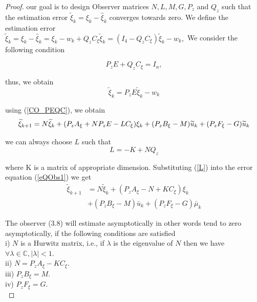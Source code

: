 \documentclass[conference]{IEEEtran}
\begin{document}
\begin{proof}
    

 our goal is to design Observer matrices $N, L, M, G, P_{z}$ and $Q_z$ such that the estimation error ${\widetilde\xi}_{k}={\xi}_{k}-{\hat{\xi}}_{k}$ converges towards zero. We define the estimation error\\
${\widetilde\xi}_{k}={\xi}_{k}-{\hat{\xi}}_{k}={\xi}_{k}-w_{k}+Q_{z}C_{\xi}{\widetilde\xi}_{k}=\left(I_{4}-Q_{z}C_{\xi}\right){\widetilde\xi}_{k}-w_{k},$
We consider the following condition

\begin{equation}\label{CO_PEQC}
    P_{z}E+Q_{z}C_{\xi}=I_{n},
\end{equation}

thus, we obtain \\
\begin{equation}
    \widetilde\xi_{k}=P_{z}E\widetilde\xi_{k}-w_{k}
\end{equation}

using (\ref{CO_PEQC}), we obtain 
\begin{equation}\label{eQObs1}
 \widetilde{\xi}_{k+1}=N\widetilde\xi_{k}+(P_{z}A_{\xi}+N P_{z}E \\
 -L C_{\xi})\xi_{k}+(P_{z}B_{\xi}-M)\widetilde{u}_{k}+(P_{z}F_{\xi}-G)\widetilde{u}_{k}
\end{equation}

we can always choose $L$ such that
\begin{equation}\label{L}
    L = -K + NQ_z
\end{equation}

where K is a matrix of appropriate dimension. Substituting (\ref{L}) into the error equation (\ref{eQObs1}) we get
\begin{align*}
    \tilde{\xi}_{k+1}&=N \tilde{\xi}_k+\left(P_z A_{\xi}-N+K C_{\xi}\right) \xi_k\\
    &+\left(P_z B_{\xi}-M\right) \bar{u}_k+\left(P_z F_{\xi}-G\right) \bar{\mu}_k
\end{align*}


The observer (3.8) will estimate asymptotically  in other words tend to zero asymptotically, if the following conditions are satisfied\\

i) $N$ is a Hurwitz matrix, i.e., if $\lambda$ is the eigenvalue of $N$ then we have $\forall \lambda \in \mathbb{C},|\lambda|<1$.\\
ii) $N=P_z A_{\xi}-K C_{\xi}$.\\
iii) $P_z B_{\xi}=M$.\\
iv) $P_z F_{\xi}=G$.\\


\end{proof}
\end{document}
